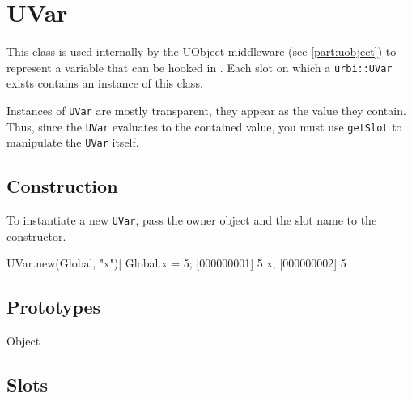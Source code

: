 
\section{UVar}

This class is used internally by the UObject middleware (see
\autoref{part:uobject}) to represent a variable that can be hooked in
\Cxx. Each slot on which a \Cxx \lstinline|urbi::UVar| exists contains an
instance of this class.

Instances of \lstinline|UVar| are mostly transparent, they appear as
the value they contain. Thus, since the \lstinline|UVar| evaluates to the
contained value, you must use \lstinline|getSlot| to manipulate the
\lstinline|UVar| itself.

\subsection{Construction}
To instantiate a new \lstinline|UVar|, pass the owner object and the slot
name to the constructor.
\begin{urbiscript}
UVar.new(Global, "x")|
Global.x = 5;
[000000001] 5
x;
[000000002] 5
\end{urbiscript}

\subsection{Prototypes}
\begin{refObjects}
\item[Object]
\end{refObjects}

\subsection{Slots}

